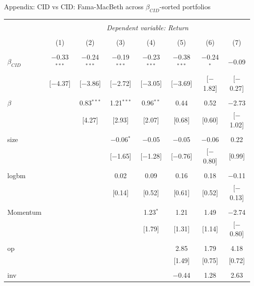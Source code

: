 \documentclass{beamer}
\begin{document}
{\renewcommand{\arraystretch}{0.50}
\begin{frame}{Appendix: CID vs CID: Fama-MacBeth across $\beta_{CID}$-sorted portfolios}
\vspace{-0.4cm}
\begin{table}[!htbp] \centering 
\begin{tabular}{@{\extracolsep{-2pt}}lccccccc} 
\\[-1.8ex]\hline 
\hline \\[-1.8ex] 
 & \multicolumn{7}{c}{\textit{Dependent variable: Return}} \\ 
\cline{2-8} 
\\[-1.8ex] & (1) & (2) & (3) & (4) & (5) & (6) & (7)\\ 
\hline \\[-1.0ex] 
 $\beta_{CID}$ & $-$0.33$^{***}$ & $-$0.24$^{***}$ & $-$0.19$^{***}$ & $-$0.23$^{***}$ & $-$0.38$^{***}$ & $-$0.24$^{*}$ & $-$0.09 \\ 
  & [$-$4.37] & [$-$3.86] & [$-$2.72] & [$-$3.05] & [$-$3.69] & [$-$1.82] & [$-$0.27] \\ 
  & & & & & & & \\ 
 $\beta$ &  & 0.83$^{***}$ & 1.21$^{***}$ & 0.96$^{**}$ & 0.44 & 0.52 & $-$2.73 \\ 
  &  & [4.27] & [2.93] & [2.07] & [0.68] & [0.60] & [$-$1.02] \\ 
  & & & & & & & \\ 
 size &  &  & $-$0.06$^{*}$ & $-$0.05 & $-$0.05 & $-$0.06 & 0.22 \\ 
  &  &  & [$-$1.65] & [$-$1.28] & [$-$0.76] & [$-$0.80] & [0.99] \\ 
  & & & & & & & \\ 
 logbm &  &  & 0.02 & 0.09 & 0.16 & 0.18 & $-$0.11 \\ 
  &  &  & [0.14] & [0.52] & [0.61] & [0.52] & [$-$0.13] \\ 
  & & & & & & & \\ 
 Momentum &  &  &  & 1.23$^{*}$ & 1.21 & 1.49 & $-$2.74 \\ 
  &  &  &  & [1.79] & [1.31] & [1.14] & [$-$0.80] \\ 
  & & & & & & & \\ 
 op &  &  &  &  & 2.85 & 1.79 & 4.18 \\ 
  &  &  &  &  & [1.49] & [0.75] & [0.72] \\ 
  & & & & & & & \\ 
 inv &  &  &  &  & $-$0.44 & 1.28 & 2.63 \\ 

\end{tabular}
\end{table}
\end{frame}}
\end{document}
